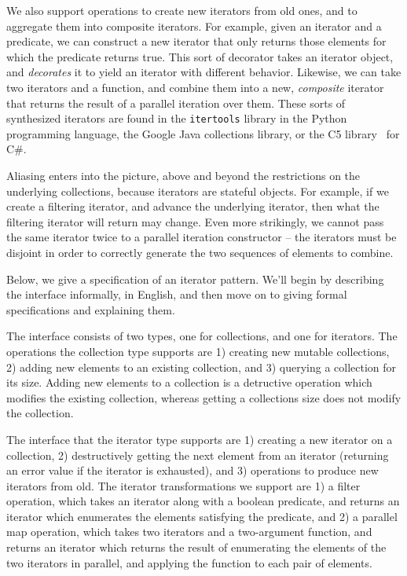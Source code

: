 \documentclass[preprint,natbib]{sigplanconf}
\begin{document}
We also support operations to create new iterators from old ones, and
to aggregate them into composite iterators. For example, given an
iterator and a predicate, we can construct a new iterator that only
returns those elements for which the predicate returns true. This sort
of decorator takes an iterator object, and \emph{decorates} it to
yield an iterator with different behavior. Likewise, we can take two
iterators and a function, and combine them into a new,
\emph{composite} iterator that returns the result of a parallel
iteration over them.  These sorts of synthesized iterators are found
in the \texttt{itertools} library in the Python programming language,
the Google Java collections library, or the C5 library~\cite{C5} for
C\#.

Aliasing enters into the picture, above and beyond the restrictions on
the underlying collections, because iterators are stateful
objects. For example, if we create a filtering iterator, and advance
the underlying iterator, then what the filtering iterator will return
may change. Even more strikingly, we cannot pass the same iterator
twice to a parallel iteration constructor -- the iterators must be
disjoint in order to correctly generate the two sequences of elements
to combine.

Below, we give a specification of an iterator pattern. We'll begin 
by describing the interface informally, in English, and then move on 
to giving formal specifications and explaining them. 

The interface consists of two types, one for collections, and one for
iterators. The operations the collection type supports are 1) creating
new mutable collections, 2) adding new elements to an existing
collection, and 3) querying a collection for its size. Adding new
elements to a collection is a detructive operation which modifies the
existing collection, whereas getting a collections size does not
modify the collection.

The interface that the iterator type supports are 1) creating a new
iterator on a collection, 2) destructively getting the next element
from an iterator (returning an error value if the iterator is
exhausted), and 3) operations to produce new iterators from old. The
iterator transformations we support are 1) a filter operation, which
takes an iterator along with a boolean predicate, and returns an
iterator which enumerates the elements satisfying the predicate, and
2) a parallel map operation, which takes two iterators and a
two-argument function, and returns an iterator which returns the
result of enumerating the elements of the two iterators in parallel,
and applying the function to each pair of elements. 
\end{document}
